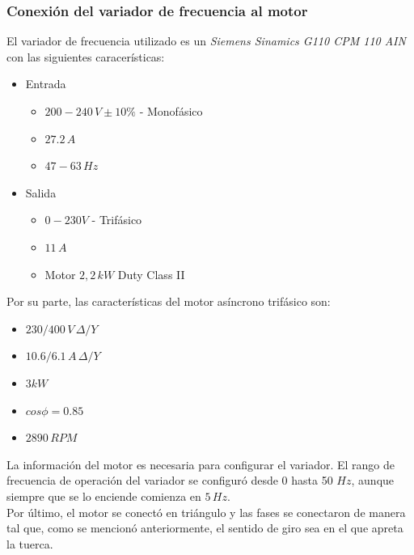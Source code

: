 \documentclass[a4paper,11pt,twoside]{IT-CNEA}
\begin{document}
\subsubsection{Conexión del variador de frecuencia al motor}
El variador de frecuencia utilizado es un \textit{Siemens Sinamics G110 CPM 110 AIN} con las siguientes caracerísticas:
\begin{itemize}
\item Entrada
\begin{itemize}
\item $200-240\,V\pm10\%$ - Monofásico
\item $27.2\,A$
\item $47-63\,Hz$
\end{itemize}
\item Salida
\begin{itemize}
\item $0-230V$ - Trifásico
\item $11\,A$
\item Motor $2,2\,kW$ Duty Class II
\end{itemize}
\end{itemize}
Por su parte, las características del motor asíncrono trifásico son:
\begin{itemize}
\item $230/400\,V\,\varDelta/Y$
\item $10.6/6.1\,A\,\varDelta/Y$
\item $3kW$
\item $cos\phi = 0.85$
\item $2890\,RPM$
\end{itemize}
La información del motor es necesaria para configurar el variador. El rango de frecuencia de operación del variador se configuró desde 0 hasta 50 $Hz$, aunque siempre que se lo enciende comienza en $5\,Hz$.
\\Por último, el motor se conectó en triángulo y las fases se conectaron de manera tal que, como se mencionó anteriormente, el sentido de giro sea en el que apreta la tuerca. 
\end{document}
